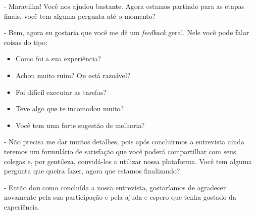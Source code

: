 - Maravilha! Você nos ajudou bastante. Agora estamos partindo para as etapas finais, você tem alguma pergunta até o momento? 

- Bem, agora eu gostaria que você me dê um \textit{feedback} geral. Nele você pode falar coisas do tipo:
\begin{itemize}
    \item Como foi a sua experiência? 
    \item Achou muito ruim? Ou está razoável? 
    \item Foi difícil executar as tarefas?
    \item Teve algo que te incomodou muito?
    \item Você tem uma forte sugestão de melhoria? 
\end{itemize}

- Não precisa me dar muitos detalhes, pois após concluirmos a entrevista ainda teremos um formulário de satisfação que você poderá compartilhar com seus colegas e, por gentileza, convidá-los a utilizar nossa plataforma. Você tem alguma pergunta que queira fazer, agora que estamos finalizando?

- Então dou como concluída a nossa entrevista, gostaríamos de agradecer novamente pela sua participação e pela ajuda e espero que tenha gostado da experiência. 
